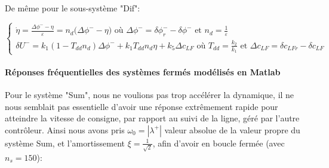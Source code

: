 \documentclass{report}
\begin{document}
De même pour le sous-système "Dif":

\begin{equation*}
    \begin{cases}
        \dot{\eta} = \frac{\Delta \phi^- - \eta}{\varepsilon}
        =  n_d\big(\Delta \phi^- - \eta \big) 
        \text{ où } \Delta \phi^- = \delta \phi^-_r - \delta \phi^-
        \text{ et } n_d = \frac{1}{\varepsilon} \\
        \delta{U^-} = k_1(1 - T_{dd}n_d)\Delta \phi^- +
        k_1T_{dd}n_d\eta + k_5 \Delta c_{LF}\text{ où } T_{dd} = \frac{k_2}{k_1} \text{ et }
        \Delta c_{LF} = \delta c_{LFr} - \delta c_{LF}
    \end{cases}
\end{equation*}

\paragraph{Réponses fréquentielles des systèmes fermés modélisés 
en Matlab}

Pour le système "Sum", nous ne voulions pas trop accélérer la dynamique,
il ne nous semblait pas essentielle d'avoir une réponse extrêmement
rapide pour atteindre la vitesse de consigne, par rapport au
suivi de la ligne, géré par l'autre contrôleur.
Ainsi nous avons pris $\omega_0 = |\lambda^+|$ 
valeur absolue de la valeur propre du système Sum,
et l'amortissement $\xi = \frac{1}{\sqrt{2}}$, afin d'avoir en boucle fermée
(avec $n_s=150$):
\end{document}
